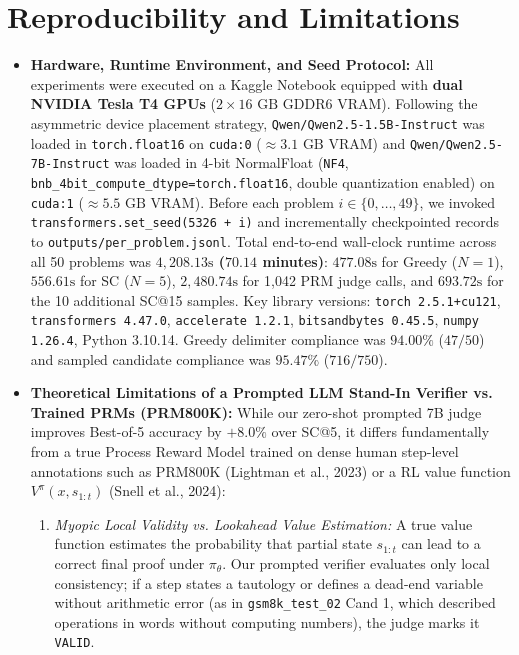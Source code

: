 \documentclass[10pt,a4paper]{article}
\begin{document}
\section{Reproducibility and Limitations}

\begin{itemize}
    \item \textbf{Hardware, Runtime Environment, and Seed Protocol:}
    All experiments were executed on a Kaggle Notebook equipped with \textbf{dual NVIDIA Tesla T4 GPUs} ($2 \times 16\text{ GB}$ GDDR6 VRAM). Following the asymmetric device placement strategy, \texttt{Qwen/Qwen2.5-1.5B-Instruct} was loaded in \texttt{torch.float16} on \texttt{cuda:0} ($\approx 3.1\text{ GB}$ VRAM) and \texttt{Qwen/Qwen2.5-7B-Instruct} was loaded in 4-bit NormalFloat (\texttt{NF4}, \texttt{bnb\_4bit\_compute\_dtype=torch.float16}, double quantization enabled) on \texttt{cuda:1} ($\approx 5.5\text{ GB}$ VRAM). Before each problem $i \in \{0, \dots, 49\}$, we invoked \texttt{transformers.set\_seed(5326 + i)} and incrementally checkpointed records to \texttt{outputs/per\_problem.jsonl}. Total end-to-end wall-clock runtime across all 50 problems was \textbf{$4{,}208.13\text{s}$ ($70.14$ minutes)}: $477.08\text{s}$ for Greedy ($N=1$), $556.61\text{s}$ for SC ($N=5$), $2{,}480.74\text{s}$ for 1,042 PRM judge calls, and $693.72\text{s}$ for the 10 additional SC@15 samples. Key library versions: \texttt{torch 2.5.1+cu121}, \texttt{transformers 4.47.0}, \texttt{accelerate 1.2.1}, \texttt{bitsandbytes 0.45.5}, \texttt{numpy 1.26.4}, Python 3.10.14. Greedy delimiter compliance was $94.00\%$ ($47/50$) and sampled candidate compliance was $95.47\%$ ($716/750$).
    \item \textbf{Theoretical Limitations of a Prompted LLM Stand-In Verifier vs. Trained PRMs (PRM800K):}
    While our zero-shot prompted 7B judge improves Best-of-5 accuracy by $+8.0\%$ over SC@5, it differs fundamentally from a true Process Reward Model trained on dense human step-level annotations such as PRM800K (Lightman et al., 2023) or a RL value function $V^\pi(x, s_{1:t})$ (Snell et al., 2024):
    \begin{enumerate}
        \item \textit{Myopic Local Validity vs. Lookahead Value Estimation:} A true value function estimates the probability that partial state $s_{1:t}$ can lead to a correct final proof under $\pi_\theta$. Our prompted verifier evaluates only local consistency; if a step states a tautology or defines a dead-end variable without arithmetic error (as in \texttt{gsm8k\_test\_02} Cand 1, which described operations in words without computing numbers), the judge marks it \texttt{VALID}.

\end{enumerate}
\end{itemize}
\end{document}
